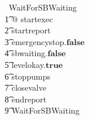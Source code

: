 \documentclass{report}
\newcommand{\true}{\ensuremath{\mathbf{true}}}
\newcommand{\false}{\ensuremath{\mathbf{false}}}
\begin{document}
\begin{circus}
   \circprocess\ WaitForSBWaiting \circdef \circbegin \\
   \t1 @ startexec \then \\
        \t2 startreport \then \\
            \t3 emergencystop.\false \then \\
                \t4 sbwaiting.\false \then \\
                   \t5 levelokay.\true \then \\
                        \t6 stoppumps \then \\
                            \t7 closevalve \then \\
                                \t8 endreport \then \\
                                   \t9 WaitForSBWaiting \\
  \circend
\end{circus}
\end{document}
